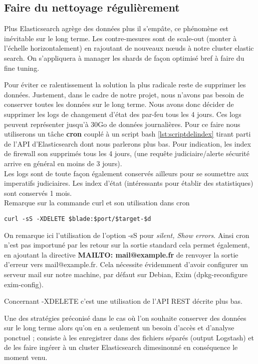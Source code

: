 \subsection{Faire du nettoyage régulièrement}
Plus Elasticsearch agrège des données plus il s'empâte, ce phénomène est inévitable 
sur le long terme. Les contre-mesures sont de scale-out (monter à l'échelle horizontalement)
en rajoutant de nouveaux nœuds à notre cluster elastic search. On s'appliquera à 
manager les shards de façon optimisé bref à faire du fine tuning.

Pour éviter ce ralentissement la solution la plus radicale reste de supprimer les 
données. Justement, dans le cadre de notre projet, nous n'avons pas besoin de conserver 
toutes les données sur le long terme. Nous avons donc décider de supprimer les logs 
de changement d'état des par-feu tous les 4 jours. Ces logs peuvent représenter 
jusqu'à 30Go de données journalières. 
Pour ce faire nous utiliserons un tâche \textbf{cron} couplé à un script bash 
\ref{lst:scriptdelindex} tirant parti de l'API d'Elasticsearch dont nous parlerons 
plus bas. Pour indication, les index de firewall son supprimés tous les 4 jours, 
(une requête judiciaire/alerte sécurité arrive en général en moins de 3 jours).\\ 
Les logs sont de toute façon également conservés ailleurs pour se soumettre aux 
imperatifs judiciaires. Les index d'état (intéressants pour établir des statistiques)
sont conservés 1 mois.\\
Remarque sur la commande curl et son utilisation dans cron

\begin{lstlisting}[style=code,label={lst:curlexemple},caption={Extrait de notre script \ref{lst:scriptdelindex}}]
curl -sS -XDELETE $blade:$port/$target-$d
\end{lstlisting}

On remarque ici l'utilisation de l'option -sS pour \textit{silent, Show errors}.
Ainsi cron n'est pas importuné par les retour sur la sortie standard cela permet
également, en ajoutant la directive \textbf{MAILTO: mail@example.fr} de renvoyer
la sortie d'erreur vers mail@example.fr. Cela nécessite évidemment d'avoir configurer
un serveur mail sur notre machine, par défaut sur Debian, Exim (dpkg-reconfigure 
exim-config).

Concernant -XDELETE c'est une utilisation de l'API REST décrite plus bas.

Une des stratégies préconisé dans le cas où l'on souhaite conserver des données sur
le long terme alors qu'on en a seulement un besoin d'accès et d'analyse ponctuel ;
consiste à les enregistrer dans des fichiers séparés (output Logstash) et de les 
faire ingérer à un cluster Elasticsearch dimesinonné en conséquence le moment venu.



